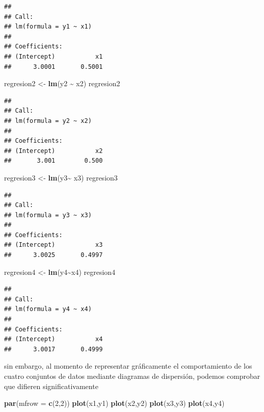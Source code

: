 \documentclass[
]{book}
\newenvironment{Shaded}{\begin{snugshade}}{\end{snugshade}}
\newcommand{\AttributeTok}[1]{\textcolor[rgb]{0.13,0.29,0.53}{#1}}
\newcommand{\DecValTok}[1]{\textcolor[rgb]{0.00,0.00,0.81}{#1}}
\newcommand{\FunctionTok}[1]{\textcolor[rgb]{0.13,0.29,0.53}{\textbf{#1}}}
\newcommand{\NormalTok}[1]{#1}
\newcommand{\OtherTok}[1]{\textcolor[rgb]{0.56,0.35,0.01}{#1}}
\newcommand{\SpecialCharTok}[1]{\textcolor[rgb]{0.81,0.36,0.00}{\textbf{#1}}}
\begin{document}
\begin{verbatim}
## 
## Call:
## lm(formula = y1 ~ x1)
## 
## Coefficients:
## (Intercept)           x1  
##      3.0001       0.5001
\end{verbatim}

\begin{Shaded}
\begin{Highlighting}[]
\NormalTok{regresion2 }\OtherTok{\textless{}{-}} \FunctionTok{lm}\NormalTok{(y2 }\SpecialCharTok{\textasciitilde{}}\NormalTok{ x2)}
\NormalTok{regresion2}
\end{Highlighting}
\end{Shaded}

\begin{verbatim}
## 
## Call:
## lm(formula = y2 ~ x2)
## 
## Coefficients:
## (Intercept)           x2  
##       3.001        0.500
\end{verbatim}

\begin{Shaded}
\begin{Highlighting}[]
\NormalTok{regresion3 }\OtherTok{\textless{}{-}} \FunctionTok{lm}\NormalTok{(y3}\SpecialCharTok{\textasciitilde{}}\NormalTok{ x3)}
\NormalTok{regresion3}
\end{Highlighting}
\end{Shaded}

\begin{verbatim}
## 
## Call:
## lm(formula = y3 ~ x3)
## 
## Coefficients:
## (Intercept)           x3  
##      3.0025       0.4997
\end{verbatim}

\begin{Shaded}
\begin{Highlighting}[]
\NormalTok{regresion4 }\OtherTok{\textless{}{-}} \FunctionTok{lm}\NormalTok{(y4}\SpecialCharTok{\textasciitilde{}}\NormalTok{x4)}
\NormalTok{regresion4}
\end{Highlighting}
\end{Shaded}

\begin{verbatim}
## 
## Call:
## lm(formula = y4 ~ x4)
## 
## Coefficients:
## (Intercept)           x4  
##      3.0017       0.4999
\end{verbatim}

sin embargo, al momento de representar gráficamente el comportamiento de los cuatro conjuntos de datos mediante diagramas de dispersión, podemos comprobar que difieren significativamente

\begin{Shaded}
\begin{Highlighting}[]
\FunctionTok{par}\NormalTok{(}\AttributeTok{mfrow =} \FunctionTok{c}\NormalTok{(}\DecValTok{2}\NormalTok{,}\DecValTok{2}\NormalTok{))}
\FunctionTok{plot}\NormalTok{(x1,y1)}
\FunctionTok{plot}\NormalTok{(x2,y2)}
\FunctionTok{plot}\NormalTok{(x3,y3)}
\FunctionTok{plot}\NormalTok{(x4,y4)}
\end{Highlighting}
\end{Shaded}
\end{document}
